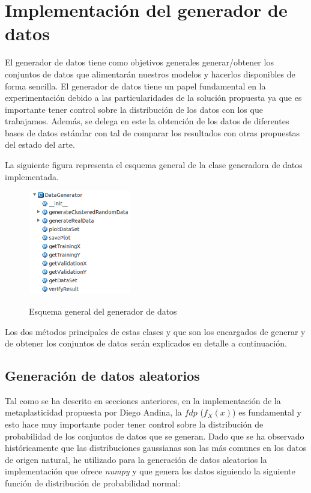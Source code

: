 \documentclass[10pt,a4paper]{report}
\begin{document}
\section{Implementación del generador de datos}
El generador de datos tiene como objetivos generales generar/obtener los conjuntos de datos que alimentarán nuestros modelos y hacerlos disponibles de forma sencilla. El generador de datos tiene un papel fundamental en la experimentación debido a las particularidades de la solución propuesta ya que es importante tener control sobre la distribución de los datos con los que trabajamos. Además, se delega en este la obtención de los datos de diferentes bases de datos estándar con tal de comparar los resultados con otras propuestas del estado del arte.

La siguiente figura representa el esquema general de la clase generadora de datos implementada.
\begin{figure}[b]{}
    \centering
    \includegraphics[width=0.4\textwidth]{img/GeneradorEsquema.png}
    \label{fig:EsquemaGenerador}
    \caption{Esquema general del generador de datos}
\end{figure}
Los dos métodos principales de estas clases y que son los encargados de generar y de obtener los conjuntos de datos serán explicados en detalle a continuación.

\subsection{Generación de datos aleatorios}
Tal como se ha descrito en secciones anteriores, en la implementación de la metaplasticidad propuesta por Diego Andina\citep{Andina2009}, la $fdp$ ($f_X(x)$) es fundamental y esto hace muy importante poder tener control sobre la distribución de probabilidad de los conjuntos de datos que se generan. Dado que se ha observado históricamente que las distribuciones gaussianas son las más comunes en los datos de origen natural, he utilizado para la generación de datos aleatorios la implementación que ofrece \textit{numpy} y que genera los datos siguiendo la siguiente función de distribución de probabilidad normal: 
\end{document}
